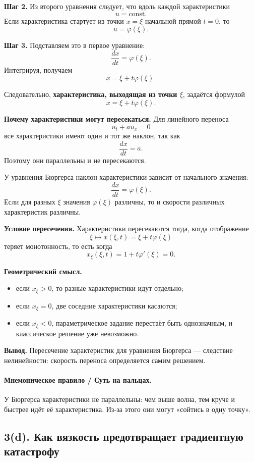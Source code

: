 \documentclass[a4paper,12pt]{article}
\begin{document}
\textbf{Шаг 2.} Из второго уравнения следует, что вдоль каждой характеристики
\[
u=\mathrm{const}.
\]
Если характеристика стартует из точки $x=\xi$ начальной прямой $t=0$, то
\[
u=\varphi(\xi).
\]

\textbf{Шаг 3.} Подставляем это в первое уравнение:
\[
\frac{dx}{dt}=\varphi(\xi).
\]
Интегрируя, получаем
\[
x=\xi+t\varphi(\xi).
\]

Следовательно, \textbf{характеристика, выходящая из точки $\xi$}, задаётся формулой
\[
x=\xi+t\varphi(\xi).
\]

\textbf{Почему характеристики могут пересекаться.}
Для линейного переноса
\[
u_t+a u_x=0
\]
все характеристики имеют один и тот же наклон, так как
\[
\frac{dx}{dt}=a.
\]
Поэтому они параллельны и не пересекаются.

У уравнения Бюргерса наклон характеристики зависит от начального значения:
\[
\frac{dx}{dt}=\varphi(\xi).
\]
Если для разных $\xi$ значения $\varphi(\xi)$ различны, то и скорости различных характеристик различны.

\textbf{Условие пересечения.}
Характеристики пересекаются тогда, когда отображение
\[
\xi\mapsto x(\xi,t)=\xi+t\varphi(\xi)
\]
теряет монотонность, то есть когда
\[
x_\xi(\xi,t)=1+t\varphi'(\xi)=0.
\]

\textbf{Геометрический смысл.}
\begin{itemize}
  \item если $x_\xi>0$, то разные характеристики идут отдельно;
  \item если $x_\xi=0$, две соседние характеристики касаются;
  \item если $x_\xi<0$, параметрическое задание перестаёт быть однозначным, и классическое решение уже невозможно.
\end{itemize}

\textbf{Вывод.}
Пересечение характеристик для уравнения Бюргерса --- следствие нелинейности: скорость переноса определяется самим решением.

\paragraph{Мнемоническое правило / Суть на пальцах.}
У Бюргерса характеристики не параллельны: чем выше волна, тем круче и быстрее идёт её характеристика. Из-за этого они могут «сойтись в одну точку».

\subsection*{3(d). Как вязкость предотвращает градиентную катастрофу}
\end{document}
